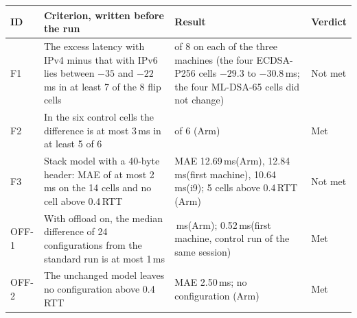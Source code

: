 \documentclass[preprint,12pt]{elsarticle}
\newcommand{\ms}{\,ms\xspace}
\begin{document}
\begin{center}\begin{minipage}{\textwidth}\footnotesize\captionsetup{justification=raggedright,singlelinecheck=off}
\label{tab:prereg_ipv4}
\renewcommand{\arraystretch}{1.12}
\begin{tabularx}{\textwidth}{@{}>{\raggedright\arraybackslash}p{}>{\raggedright\arraybackslash}X>{\raggedright\arraybackslash}X>{\raggedright\arraybackslash}p{}@{}}
\toprule
ID & Criterion, written before the run & Result & Verdict \\
\midrule
F1 & The excess latency with IPv4 minus that with IPv6 lies between $-35$ and $-22$\ms in at least 7 of the 8 flip cells & 4 of 8 on each of the three machines (the four ECDSA-P256 cells $-29.3$ to $-30.8$\ms; the four ML-DSA-65 cells did not change) & Not met \\
F2 & In the six control cells the difference is at most 3\ms in at least 5 of 6 & 6 of 6 (Arm) & Met \\
F3 & Stack model with a 40-byte header: MAE of at most 2\ms on the 14 cells and no cell above 0.4\,RTT & MAE 12.69\ms (Arm), 12.84\ms (first machine), 10.64\ms (i9); 5 cells above 0.4\,RTT (Arm) & Not met \\
OFF-1 & With offload on, the median difference of 24 configurations from the standard run is at most 1\ms & 0.19\ms (Arm); 0.52\ms (first machine, control run of the same session) & Met \\
OFF-2 & The unchanged model leaves no configuration above 0.4\,RTT & MAE 2.50\ms; no configuration (Arm) & Met \\
\bottomrule
\end{tabularx}
\end{minipage}\end{center}
\end{document}
